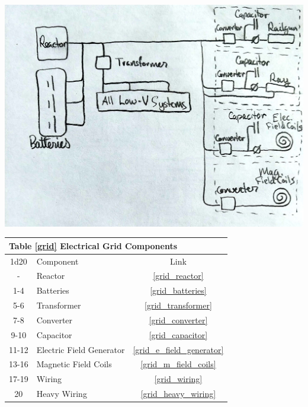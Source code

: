 \documentclass[a4paper]{article}
\begin{document}
\vspace{0.2cm}
\includegraphics[scale=0.3]{Electrical_Grid}

\vspace{0.5cm} \hspace{0.25\linewidth}
\begin{tabular}{@{} | c | l | c | @{}}
\toprule
\multicolumn{3}{|l|}{Table \ref{grid} Electrical Grid Components} \\
\toprule
1d20 & Component & Link \\
\midrule
- & Reactor & \ref{grid_reactor} \\
1-4 & Batteries & \ref{grid_batteries} \\
5-6 & Transformer & \ref{grid_transformer} \\
7-8 & Converter & \ref{grid_converter} \\
9-10 & Capacitor & \ref{grid_capacitor} \\
11-12 & Electric Field Generator & \ref{grid_e_field_generator} \\
13-16 & Magnetic Field Coils & \ref{grid_m_field_coils} \\
17-19 & Wiring & \ref{grid_wiring} \\
20 & Heavy Wiring & \ref{grid_heavy_wiring} \\
\bottomrule
\end{tabular}
\end{document}
